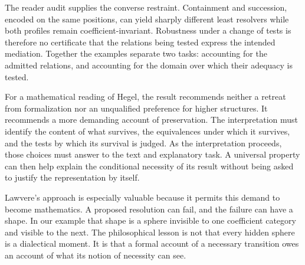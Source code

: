 The reader audit supplies the converse restraint. Containment and
succession, encoded on the same positions, can yield sharply different
least resolvers while both profiles remain coefficient-invariant.
Robustness under a change of tests is therefore no certificate that the
relations being tested express the intended mediation. Together the
examples separate two tasks: accounting for the admitted relations,
and accounting for the domain over which their adequacy is tested.

For a mathematical reading of Hegel, the result recommends neither a
retreat from formalization nor an unqualified preference for higher
structures. It recommends a more demanding account of preservation.
The interpretation must identify the content of what survives, the
equivalences under which it survives, and the tests by which its survival
is judged. As the interpretation proceeds, those choices must answer
to the text and explanatory task. A universal property can then help
explain the conditional necessity of its result without being asked
to justify the representation by itself.

Lawvere's approach is especially valuable because it permits this demand
to become mathematics. A proposed resolution can fail, and the failure
can have a shape. In our example that shape is a sphere invisible to one
coefficient category and visible to the next. The philosophical lesson
is not that every hidden sphere is a dialectical moment. It is that a
formal account of a necessary transition owes an account of what its
notion of necessity can see.
